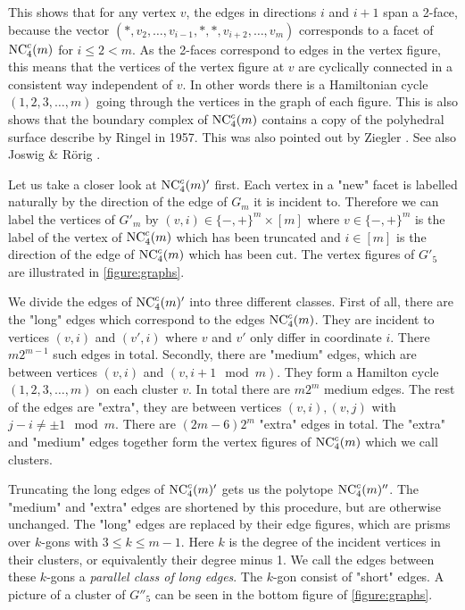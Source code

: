  This shows that for any vertex $v$, the edges in directions $i$ and $i+1$ span a 2-face, because
the vector $(*,v_2, \dots, v_{i-1}, *, *, v_{i+2}, \dots, v_m)$ corresponds to a facet of $\mathrm{NC}^c_4(m)$
for $i\le 2 < m$. As the 2-faces correspond to edges in the vertex figure, this means that the vertices 
of the vertex figure at $v$ are cyclically connected in a consistent way independent of $v$. In other words
there is a Hamiltonian cycle $(1,2,3,\dots, m)$ going through the vertices in the graph of each figure.
This is also shows that the boundary complex of $\mathrm{NC}^c_4(m)$ contains a copy of the polyhedral surface 
describe by Ringel \cite{ringel55:_ueber_probl_wuerf_wuerf} in 1957. This was also pointed out by
Ziegler \cite[Sect 3.]{Z100}. See also Joswig \& Rörig \cite{joswig:_neigh}.

Let us take a closer look at $\mathrm{NC}^c_4(m)'$ first.  Each vertex in a "new" facet is labelled naturally by
the direction of the edge of $G_m$ it is incident to. Therefore we can label the vertices of $G'_m$
by $(v,i) \in \{-,+\}^m \times [m]$ where $v \in \{-,+\}^m$ is the label of the vertex of $\mathrm{NC}^c_4(m)$ which has been truncated and $i \in [m]$ 
is the direction of the edge of $\mathrm{NC}^c_4(m)$ which has been cut. The vertex figures of $G'_5$ are illustrated in \ref{figure:graphs}.

We divide the edges of $\mathrm{NC}^c_4(m)'$ into three different classes. First of all, there are the "long" edges which correspond to the edges $\mathrm{NC}^c_4(m)$.
They are incident to vertices $(v,i)$ and $(v',i)$ where $v$ and $v'$ only differ in coordinate $i$. There $m2^{m-1}$ such edges in total. Secondly, 
there are "medium" edges, which are between vertices $(v,i)$ and $(v,i+1\mod m)$. They form a Hamilton cycle $(1,2,3,\dots, m)$ on each cluster $v$. In total there are $m2^m$ medium edges. The rest of the edges are "extra", they are between vertices $(v,i), (v,j)$ with $j-i \neq \pm 1 \mod m$.
There are $(2m-6)2^m$ "extra" edges in total. The "extra" and "medium" edges together form the vertex figures of $\mathrm{NC}^c_4(m)$ which we call clusters. 

Truncating the long edges of $\mathrm{NC}^c_4(m)'$ gets us the polytope $\mathrm{NC}^c_4(m)''$. The "medium" and "extra" edges are shortened by this procedure, but are otherwise unchanged. The "long" edges are replaced by their edge figures, which are prisms over $k$-gons with $3 \le k \le m-1$. Here $k$ is the degree of the incident vertices in their clusters, or equivalently their degree minus 1. We call the edges between these $k$-gons a \textit{parallel class of long edges}. The $k$-gon consist of "short" edges. A picture of a cluster of $G''_5$ can be seen in the bottom figure of \ref{figure:graphs}.

